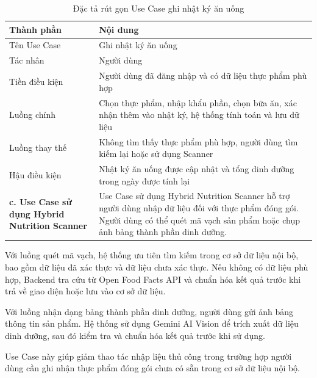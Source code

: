\begin{table}[H]
\centering
\caption{Đặc tả rút gọn Use Case ghi nhật ký ăn uống}
\begin{tabular}{|p{4cm}|p{11cm}|}
\hline
\textbf{Thành phần} & \textbf{Nội dung} \\ \hline
Tên Use Case & Ghi nhật ký ăn uống \\ \hline
Tác nhân & Người dùng \\ \hline
Tiền điều kiện & Người dùng đã đăng nhập và có dữ liệu thực phẩm phù hợp \\ \hline
Luồng chính & Chọn thực phẩm, nhập khẩu phần, chọn bữa ăn, xác nhận thêm vào nhật ký, hệ thống tính toán và lưu dữ liệu \\ \hline
Luồng thay thế & Không tìm thấy thực phẩm phù hợp, người dùng tìm kiếm lại hoặc sử dụng Scanner \\ \hline
Hậu điều kiện & Nhật ký ăn uống được cập nhật và tổng dinh dưỡng trong ngày được tính lại \\ \hline
\textbf{c. Use Case sử dụng Hybrid Nutrition Scanner} & Use Case sử dụng Hybrid Nutrition Scanner hỗ trợ người dùng nhập dữ liệu đối với thực phẩm đóng gói. Người dùng có thể quét mã vạch sản phẩm hoặc chụp ảnh bảng thành phần dinh dưỡng. \\ \hline
\end{tabular}
\end{table}

Với luồng quét mã vạch, hệ thống ưu tiên tìm kiếm trong cơ sở dữ liệu nội bộ, bao gồm dữ liệu đã xác thực và dữ liệu chưa xác thực. Nếu không có dữ liệu phù hợp, Backend tra cứu từ Open Food Facts API và chuẩn hóa kết quả trước khi trả về giao diện hoặc lưu vào cơ sở dữ liệu.

Với luồng nhận dạng bảng thành phần dinh dưỡng, người dùng gửi ảnh bảng thông tin sản phẩm. Hệ thống sử dụng Gemini AI Vision để trích xuất dữ liệu dinh dưỡng, sau đó kiểm tra và chuẩn hóa kết quả trước khi sử dụng.

Use Case này giúp giảm thao tác nhập liệu thủ công trong trường hợp người dùng cần ghi nhận thực phẩm đóng gói chưa có sẵn trong cơ sở dữ liệu nội bộ.

